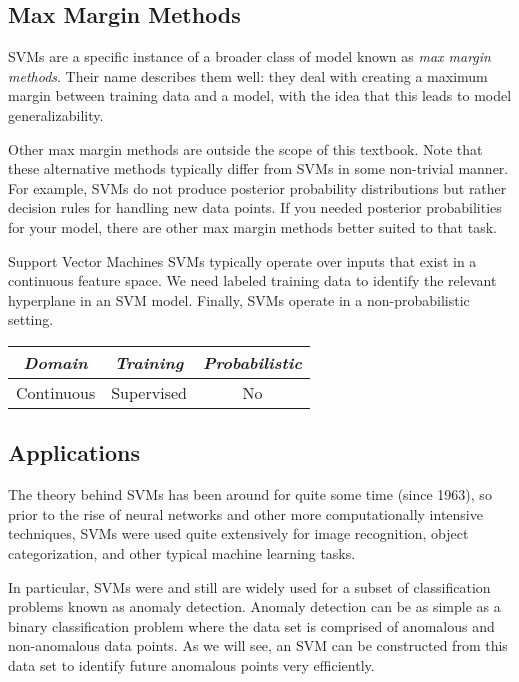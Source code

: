 \subsection{Max Margin Methods}
SVMs are a specific instance of a broader class of model known as \textit{max margin methods}. Their name describes them well: they deal with creating a maximum margin between training data and a model, with the idea that this leads to model generalizability. 

Other max margin methods are outside the scope of this textbook. Note that these alternative methods typically differ from SVMs in some non-trivial manner. For example, SVMs do not produce posterior probability distributions but rather decision rules for handling new data points. If you needed posterior probabilities for your model, there are other max margin methods better suited to that task.

\begin{mlcube}{Support Vector Machines}
SVMs typically operate over inputs that exist in a continuous feature space. We need labeled training data to identify the relevant hyperplane in an SVM model. Finally, SVMs operate in a non-probabilistic setting.
\begin{center}
    \begin{tabular}{c|c|c}
    \textit{\textbf{Domain}} & \textit{\textbf{Training}} & \textit{\textbf{Probabilistic}} \\
    \hline
    Continuous & Supervised & No \\
    \end{tabular}
\end{center}
\end{mlcube}

\subsection{Applications}
The theory behind SVMs has been around for quite some time (since 1963), so prior to the rise of neural networks and other more computationally intensive techniques, SVMs were used quite extensively for image recognition, object categorization, and other typical machine learning tasks.

In particular, SVMs were and still are widely used for a subset of classification problems known as anomaly detection.
Anomaly detection can be as simple as a binary classification problem where the data set is comprised of anomalous and non-anomalous data points. As we will see, an SVM can be constructed from this data set to identify future anomalous points very efficiently.

